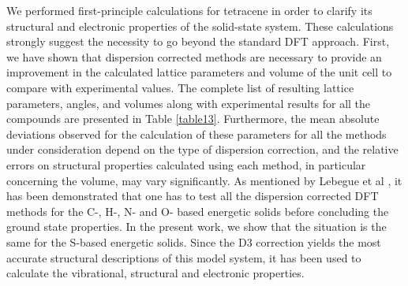  
 We performed first-principle calculations for tetracene in order to clarify its structural and electronic properties of the solid-state system. These calculations strongly suggest the necessity to go beyond the standard DFT approach. First, we have shown that dispersion corrected methods are necessary to provide an improvement in the calculated lattice parameters and volume of the unit cell to compare with experimental values. The complete list of resulting lattice parameters, angles, and volumes along with experimental results for all the compounds are presented in Table \ref{table13}. Furthermore, the mean absolute deviations observed for the calculation of these parameters for all the methods under consideration depend on the type of dispersion correction, and the relative errors on structural properties calculated using each method, in particular concerning the volume, may vary significantly. As mentioned by Lebegue et al \cite{appalakondaiah2015dispersion}, it has been demonstrated that one has to test all the dispersion corrected DFT methods for the C-, H-, N- and O- based energetic solids before concluding the ground state properties. In the present work, we show that the situation is the same for the S-based energetic solids. Since the D3 correction yields the most accurate structural descriptions of this model system, it has been used to calculate the vibrational, structural and electronic properties.\\
 
